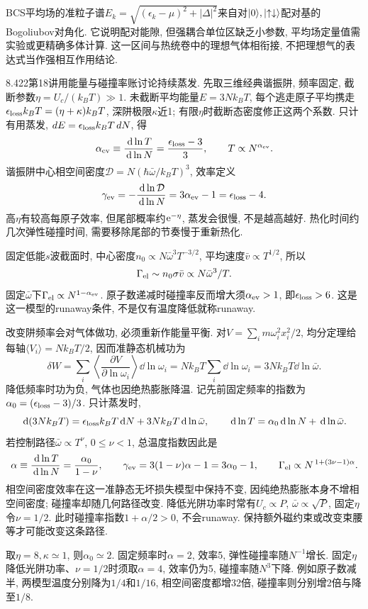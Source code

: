 BCS平均场的准粒子谱$E_k=\sqrt{(\epsilon_k-\mu)^2+|\Delta|^2}$来自对$\lvert 0\rangle,\lvert \uparrow\downarrow\rangle$配对基的Bogoliubov对角化. 它说明配对能隙, 但强耦合单位区缺乏小参数, 平均场定量值需实验或更精确多体计算. 这一区间与热统卷中的理想气体相衔接, 不把理想气的表达式当作强相互作用结论.

8.422第18讲用能量与碰撞率账讨论持续蒸发. 先取三维经典谐振阱, 频率固定, 截断参数$\eta=U_c/(k_BT)\gg1$. 未截断平均能量$E=3Nk_BT$, 每个逃走原子平均携走$\epsilon_{\rm loss}k_BT=(\eta+\kappa)k_BT$, 深阱极限$\kappa$近1; 有限$\eta$时截断态密度修正这两个系数. 只计有用蒸发, $dE=\epsilon_{\rm loss}k_BT\,dN$, 得
\[\alpha_{\rm ev}\equiv\frac{\,\mathrm d\ln T}{\,\mathrm d\ln N}
 =\frac{\epsilon_{\rm loss}-3}{3},\qquad T\propto N^{\alpha_{\rm ev}}.\]
谐振阱中心相空间密度$\mathcal D=N(\hbar\bar\omega/k_BT)^3$, 效率定义
\[\gamma_{\rm ev}=-\frac{\,\mathrm d\ln\mathcal D}{\,\mathrm d\ln N}
 =3\alpha_{\rm ev}-1=\epsilon_{\rm loss}-4.\]
高$\eta$有较高每原子效率, 但尾部概率约$\mathrm e^{-\eta}$, 蒸发会很慢, 不是越高越好. 热化时间约几次弹性碰撞时间, 需要移除尾部的节奏慢于重新热化.

固定低能$s$波截面时, 中心密度$n_0\propto N\bar\omega^3T^{-3/2}$, 平均速度$\bar v\propto T^{1/2}$, 所以
\[\Gamma_{\rm el}\sim n_0\sigma\bar v\propto N\bar\omega^3/T.\]
固定$\bar\omega$下$\Gamma_{\rm el}\propto N^{1-\alpha_{\rm ev}}$. 原子数递减时碰撞率反而增大须$\alpha_{\rm ev}>1$, 即$\epsilon_{\rm loss}>6$. 这是这一模型的runaway条件, 不是仅有温度降低就称runaway.

改变阱频率会对气体做功, 必须重新作能量平衡. 对$V=\sum_i m\omega_i^2x_i^2/2$, 均分定理给每轴$\langle V_i\rangle=Nk_BT/2$, 因而准静态机械功为
\[\delta W=\sum_i\left\langle\frac{\partial V}{\partial\ln\omega_i}\right\rangle
 \dd\ln\omega_i=Nk_BT\sum_i\dd\ln\omega_i
 =3Nk_BT\dd\ln\bar\omega.\]
降低频率时功为负, 气体也因绝热膨胀降温. 记先前固定频率的指数为$\alpha_0=(\epsilon_{\rm loss}-3)/3$. 只计蒸发时,
\[\,\mathrm d(3Nk_BT)=\epsilon_{\rm loss}k_BT\,\mathrm d N
                 +3Nk_BT\,\mathrm d\ln\bar\omega,\qquad
 \,\mathrm d\ln T=\alpha_0\,\mathrm d\ln N+\,\mathrm d\ln\bar\omega.\]
若控制路径$\bar\omega\propto T^\nu$, $0\le\nu<1$, 总温度指数因此是
\[\alpha\equiv\frac{\,\mathrm d\ln T}{\,\mathrm d\ln N}
 =\frac{\alpha_0}{1-\nu},\qquad
 \gamma_{\rm ev}=3(1-\nu)\alpha-1=3\alpha_0-1,\qquad
 \Gamma_{\rm el}\propto N^{\,1+(3\nu-1)\alpha}.\]
相空间密度效率在这一准静态无坏损失模型中保持不变, 因纯绝热膨胀本身不增相空间密度; 碰撞率却随几何路径改变. 降低光阱功率时常有$U_c\propto P$, $\bar\omega\propto\sqrt P$, 固定$\eta$令$\nu=1/2$. 此时碰撞率指数$1+\alpha/2>0$, 不会runaway. 保持额外磁约束或改变束腰等才可能改变这条路径.
\begin{example}取$\eta=8,\kappa\simeq1$, 则$\alpha_0\simeq2$. 固定频率时$\alpha=2$, 效率5, 弹性碰撞率随$N^{-1}$增长. 固定$\eta$降低光阱功率、$\nu=1/2$时须取$\alpha=4$, 效率仍为5, 碰撞率随$N^3$下降. 例如原子数减半, 两模型温度分别降为$1/4$和$1/16$, 相空间密度都增32倍, 碰撞率则分别增2倍与降至$1/8$.\end{example}


